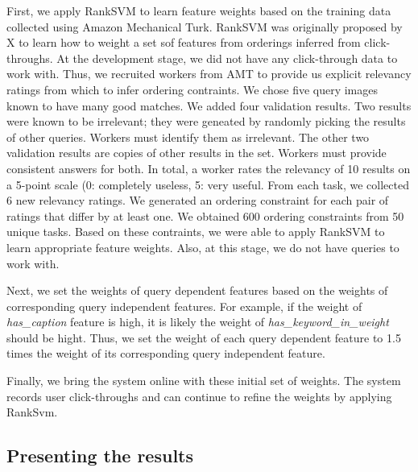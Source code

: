 \documentclass{www2010-submission}
\begin{document}
First, we apply RankSVM to learn feature weights based on the training
data collected using Amazon Mechanical Turk. RankSVM was originally
proposed by X to learn how to weight a set sof features from orderings
inferred from click-throughs. At the development stage, we did not
have any click-through data to work with. Thus, we recruited workers
from AMT to provide us explicit relevancy ratings from which to infer
ordering contraints. We chose five query images known to have many
good matches. We added four validation results.  Two results were
known to be irrelevant; they were geneated by randomly picking the
results of other queries. Workers must identify them as
irrelevant. The other two validation results are copies of other
results in the set. Workers must provide consistent answers for
both. In total, a worker rates the relevancy of 10 results on a
5-point scale (0: completely useless, 5: very useful. From each task,
we collected 6 new relevancy ratings. We generated an ordering
constraint for each pair of ratings that differ by at least one. We
obtained 600 ordering constraints from 50 unique tasks. Based on these
contraints, we were able to apply RankSVM to learn appropriate feature
weights. Also, at this stage, we do not have queries to work with.

Next, we set the weights of query dependent features based on the
weights of corresponding query independent features. For example, if
the weight of \emph{has\_caption} feature is high, it is likely the
weight of \emph{has\_keyword\_in\_weight} should be hight. Thus, we set
the weight of each query dependent feature to 1.5 times the weight of
its corresponding query independent feature.

Finally, we bring the system online with these initial set of
weights. The system records user click-throughs and can continue to
refine the weights by applying RankSvm.

\subsection{Presenting the results}

\end{document}
